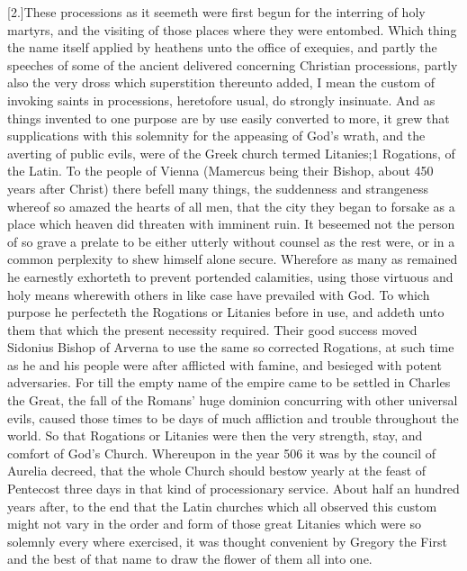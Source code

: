 [2.]These processions as it seemeth were first begun for the interring of holy martyrs, and the visiting of those places where they were entombed. Which thing the name itself applied by heathens unto the office of exequies, and partly the speeches of some of the ancient delivered concerning Christian processions, partly also the very dross which superstition thereunto added, I mean the custom of invoking saints in processions, heretofore usual, do strongly insinuate. And as things invented to one purpose are by use easily converted to more, it grew that supplications with this solemnity  for the appeasing of God’s wrath, and the averting of public evils, were of the Greek church termed Litanies;1 Rogations, of the Latin. To the people of Vienna (Mamercus being their Bishop, about 450 years after Christ) there befell many things, the suddenness and strangeness whereof so amazed the hearts of all men, that the city they began to forsake as a place which heaven did threaten with imminent ruin. It beseemed not the person of so grave a prelate to be either utterly without counsel as the rest were, or in a common perplexity to shew himself alone secure. Wherefore as many as remained he earnestly exhorteth to prevent portended calamities, using those virtuous and holy means wherewith others in like case have prevailed with God. To which purpose he perfecteth the Rogations or Litanies before in use, and addeth unto them that which the present necessity required. Their good success moved Sidonius Bishop of Arverna to use the same so corrected Rogations, at such time as he and his people were  after afflicted with famine, and besieged with potent adversaries.
 For till the empty name of the empire came to be settled in Charles the Great, the fall of the Romans’ huge dominion concurring with other universal evils, caused those times to be days of much affliction and trouble throughout the world. So that Rogations or Litanies were then the very strength, stay, and comfort of God’s Church. Whereupon in the year 506 it was by the council of Aurelia decreed, that the whole Church should bestow yearly at the feast of Pentecost three days in that kind of processionary service. About half an hundred years after, to the end that the Latin churches which all observed this custom might not vary in the order and form of those great Litanies which were so solemnly every where exercised, it was thought convenient by Gregory the First and the best of that name to draw the flower of them all into one.

